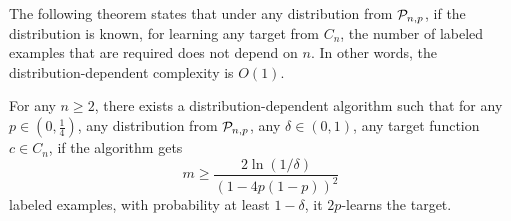 The following theorem states that under any distribution from $\P_{n,p}$, if the
distribution is known, for learning any target from $C_n$, the number of
labeled examples that are required does not depend on $n$. In other
words, the distribution-dependent complexity is $O(1)$.

\begin{theorem}
For any $n \ge 2$, there exists a distribution-dependent algorithm such that
for any $p \in (0,\frac{1}{4})$, any distribution from $\P_{n,p}$, any $\delta
\in (0,1)$, any target function $c \in C_n$,
if the algorithm gets
$$
m \ge \frac{2\ln(1/\delta)}{(1 - 4p(1-p))^2}
$$
labeled examples, with probability at least $1 - \delta$, it $2p$-learns the target.
\end{theorem}

